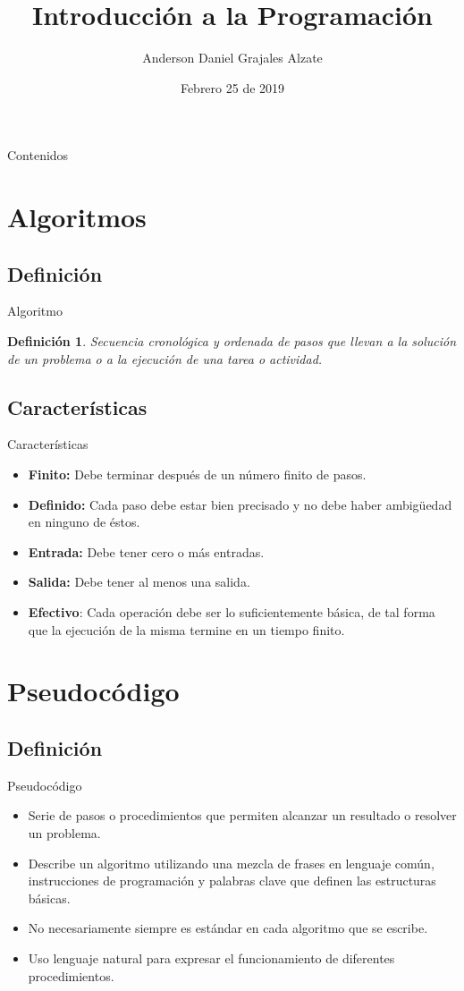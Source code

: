 \documentclass[usenames, dvipsnames, compress]{beamer}
\title[Octave y Python]{Introducción a la Programación}
\author{Anderson Daniel Grajales Alzate}
\institute[Universidad EAFIT]
{Análisis Numérico / Procesos Numéricos \\ %
	\medskip
	\textit{agrajal7@eafit.edu.co} %
	
}
\date{Febrero 25 de 2019}
\newtheorem{defa}{Definición}
\begin{document}
	\begin{frame}
		\titlepage %
	\end{frame}
	\begin{frame}[allowframebreaks]{Contenidos}
		\tableofcontents
	\end{frame}
	\section{Algoritmos}
	\subsection{Definición}
	\begin{frame}{Algoritmo}
		\begin{defa}
			Secuencia cronológica y ordenada de pasos que llevan a la solución de un problema o a la ejecución de una tarea o actividad.
		\end{defa}
	\end{frame}
	\subsection{Características}
	\begin{frame}{Características}
		\begin{itemize}[<+- | alert@ +>]
			\item \textbf{Finito: } Debe terminar después de un número finito de pasos.
			\item \textbf{Definido: } Cada paso debe estar bien precisado y no debe haber ambigüedad en ninguno de éstos.
			\item \textbf{Entrada: } Debe tener cero o más entradas.
			\item \textbf{Salida: } Debe tener al menos una salida.
			\item \textbf{Efectivo}: Cada operación debe ser lo suficientemente básica, de tal forma que la ejecución de la misma termine en un tiempo finito.
		\end{itemize}
	\end{frame}
	\section{Pseudocódigo}
	\subsection{Definición}
		\begin{frame}{Pseudocódigo}
			\begin{itemize}[<+- | alert@+>]
				\item Serie de pasos o procedimientos que permiten alcanzar un resultado o resolver un problema.
				\item Describe un algoritmo utilizando una mezcla de frases en lenguaje común, instrucciones de programación y palabras clave que definen las estructuras básicas.
				\item No necesariamente siempre es estándar en cada algoritmo que se escribe.
				\item Uso lenguaje natural para expresar el funcionamiento de diferentes procedimientos.
			\end{itemize}
		\end{frame}
\end{document}
